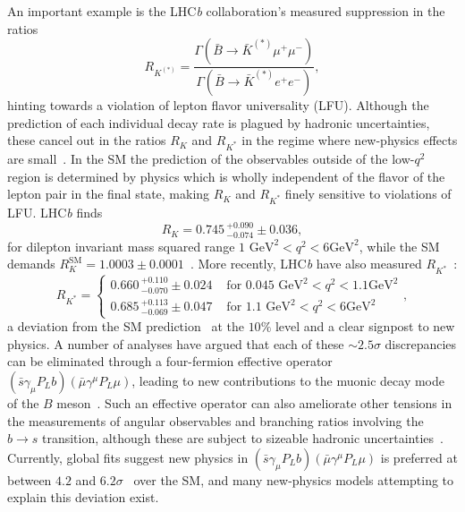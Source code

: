 An important example is the LHC\textit{b} collaboration's measured suppression
in the ratios
\begin{equation}
  \label{eq:RK}
  R_{K^{(*)}} = \frac{\Gamma(\bar B\to\bar K^{(*)}\mu^+\mu^-)}{\Gamma(\bar B\to\bar K^{(*)} e^+ e^-)},
\end{equation}
hinting towards a violation of lepton flavor universality (LFU). Although the
prediction of each individual decay rate is plagued by hadronic uncertainties,
these cancel out in the ratios $R_K$ and $R_{K^{*}}$ in the regime where
new-physics effects are small~\cite{Hiller:2003js, Capdevila:2017bsm,
  Capdevila:2016ivx}. In the SM the prediction of the observables outside of the
low-$q^2$ region is determined by physics which is wholly independent of the
flavor of the lepton pair in the final state, making $R_K$ and $R_{K^*}$ finely
sensitive to violations of LFU. LHC\textit{b} finds~\cite{Aaij:2014ora}
\begin{equation}\label{eq:RK2}
  R_K = 0.745\,_{-0.074}^{+0.090}\pm 0.036,
\end{equation}
for dilepton invariant mass squared range $1 \text{ GeV}^2 < q^2 < 6 \text{
  GeV}^2$, while the SM demands $R^{\text{SM}}_K = 1.0003 \pm
0.0001$~\cite{Bobeth:2007dw}. More recently, LHC\textit{b} have also measured
$R_{K^{*}}$~\cite{newRkstar}:
\begin{equation}\label{eq:RKstar}
    R_{K^*} =\begin{cases}
     0.660\,_{-0.070}^{+0.110}\pm 0.024 & \text{ for $0.045 \text{ GeV}^2 < q^2 < 1.1 \text{
  GeV}^2$} \\
    0.685\,_{-0.069}^{+0.113}\pm 0.047 & \text{ for $1.1 \text{ GeV}^2 < q^2 < 6 \text{
  GeV}^2$}
  \end{cases},
\end{equation}
a deviation from the SM prediction~\cite{Bordone:2016gaq} at the $10\%$ level
and a clear signpost to new physics. A number of analyses have argued that each
of these $\sim 2.5 \sigma$ discrepancies can be eliminated through a
four-fermion effective operator $(\bar{s}\gamma_\mu P_L b) (\bar{\mu}\gamma^\mu
P_L \mu)$, leading to new contributions to the muonic decay mode of the $B$
meson~\cite{Descotes-Genon:2013wba, Descotes-Genon:2015uva,
  PhysRevLett.113.241802, Hiller:2014yaa, Ghosh:2014awa, Hurth:2014vma,
  Altmannshofer:2014rta, Glashow:2014iga, Altmannshofer:2017yso,
  Capdevila:2017bsm, Ciuchini:2017mik, Geng:2017svp, DAmico:2017mtc}. Such an
effective operator can also ameliorate other tensions in the measurements of
angular observables and branching ratios involving the $b \rightarrow s$
transition, although these are subject to sizeable hadronic
uncertainties~\cite{Straub:2015ica, Lyon:2014hpa, Descotes-Genon:2014uoa,
  Jager:2014rwa}. Currently, global fits suggest new physics in
$(\bar{s}\gamma_\mu P_L b) (\bar{\mu}\gamma^\mu P_L \mu)$ is preferred at
between $4.2$ and $6.2\sigma$~\cite{Altmannshofer:2017yso, Capdevila:2017bsm,
  Ciuchini:2017mik, Geng:2017svp, DAmico:2017mtc} over the SM, and many
new-physics models attempting to explain this deviation exist.


